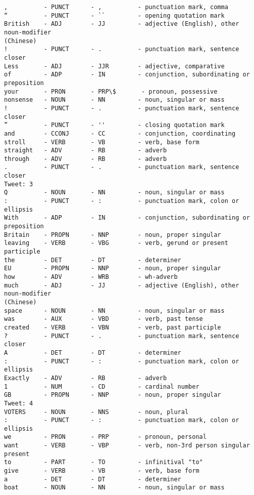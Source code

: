 \begin{Verbatim}[commandchars=\\\{\}]
,          - PUNCT      - ,          - punctuation mark, comma
“          - PUNCT      - ``         - opening quotation mark
British    - ADJ        - JJ         - adjective (English), other noun-modifier
(Chinese)
!          - PUNCT      - .          - punctuation mark, sentence closer
Less       - ADJ        - JJR        - adjective, comparative
of         - ADP        - IN         - conjunction, subordinating or preposition
your       - PRON       - PRP\$       - pronoun, possessive
nonsense   - NOUN       - NN         - noun, singular or mass
!          - PUNCT      - .          - punctuation mark, sentence closer
”          - PUNCT      - ''         - closing quotation mark
and        - CCONJ      - CC         - conjunction, coordinating
stroll     - VERB       - VB         - verb, base form
straight   - ADV        - RB         - adverb
through    - ADV        - RB         - adverb
.          - PUNCT      - .          - punctuation mark, sentence closer
Tweet: 3
Q          - NOUN       - NN         - noun, singular or mass
:          - PUNCT      - :          - punctuation mark, colon or ellipsis
With       - ADP        - IN         - conjunction, subordinating or preposition
Britain    - PROPN      - NNP        - noun, proper singular
leaving    - VERB       - VBG        - verb, gerund or present participle
the        - DET        - DT         - determiner
EU         - PROPN      - NNP        - noun, proper singular
how        - ADV        - WRB        - wh-adverb
much       - ADJ        - JJ         - adjective (English), other noun-modifier
(Chinese)
space      - NOUN       - NN         - noun, singular or mass
was        - AUX        - VBD        - verb, past tense
created    - VERB       - VBN        - verb, past participle
?          - PUNCT      - .          - punctuation mark, sentence closer
A          - DET        - DT         - determiner
:          - PUNCT      - :          - punctuation mark, colon or ellipsis
Exactly    - ADV        - RB         - adverb
1          - NUM        - CD         - cardinal number
GB         - PROPN      - NNP        - noun, proper singular
Tweet: 4
VOTERS     - NOUN       - NNS        - noun, plural
:          - PUNCT      - :          - punctuation mark, colon or ellipsis
we         - PRON       - PRP        - pronoun, personal
want       - VERB       - VBP        - verb, non-3rd person singular present
to         - PART       - TO         - infinitival "to"
give       - VERB       - VB         - verb, base form
a          - DET        - DT         - determiner
boat       - NOUN       - NN         - noun, singular or mass

\end{Verbatim}
